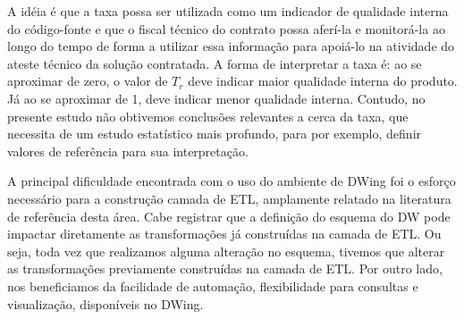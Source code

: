 A idéia é que a taxa possa ser utilizada como um indicador de qualidade interna do código-fonte e que o fiscal técnico do contrato possa aferí-la e monitorá-la ao longo do tempo de forma a utilizar essa informação para apoiá-lo na atividade do ateste técnico da solução contratada. A forma de interpretar a taxa é: ao se aproximar de zero, o valor de $T_r$ deve indicar maior qualidade interna do produto. Já ao se aproximar de 1, deve indicar menor qualidade interna. Contudo, no presente estudo não obtivemos conclusões relevantes a cerca da taxa, que necessita de um estudo estatístico mais profundo, para por exemplo, definir valores de referência para sua interpretação.

A principal dificuldade encontrada com o uso do ambiente de DWing foi o esforço necessário para a construção camada de ETL, amplamente relatado na literatura de referência desta área. Cabe registrar que a definição do esquema do DW pode impactar diretamente as transformações já construídas na camada de ETL. Ou seja, toda vez que realizamos alguma alteração no esquema, tivemos que alterar as transformações previamente construídas na camada de ETL.
Por outro lado, nos beneficiamos da facilidade de automação, flexibilidade para consultas e visualização, disponíveis no DWing.


